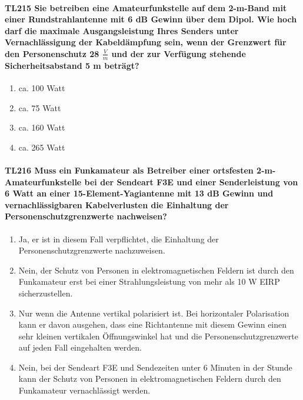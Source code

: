 \documentclass[8pt]{article}
\begin{document}
\paragraph*{TL215 Sie betreiben eine Amateurfunkstelle auf dem 2-m-Band mit einer Rundstrahlantenne mit 6 dB Gewinn über dem Dipol. Wie hoch darf die maximale Ausgangsleistung Ihres Senders unter Vernachlässigung der Kabeldämpfung sein, wenn der Grenzwert für den Personenschutz 28 $\frac{V}{m}$ und der zur Verfügung stehende Sicherheitsabstand 5 m beträgt?}
\begin{enumerate}[nolistsep,label=\Alph*]
\item ca. 100 Watt
\item ca. 75 Watt
\item ca. 160 Watt
\item ca. 265 Watt
\end{enumerate}

\paragraph*{TL216 Muss ein Funkamateur als Betreiber einer ortsfesten 2-m-Amateurfunkstelle bei der Sendeart F3E und einer Senderleistung von 6 Watt an einer 15-Element-Yagiantenne mit 13 dB Gewinn und vernachlässigbaren Kabelverlusten die Einhaltung der Personenschutzgrenzwerte nachweisen?} 
\begin{enumerate}[nolistsep,label=\Alph*]
\item Ja, er ist in diesem Fall verpflichtet, die Einhaltung der Personenschutzgrenzwerte nachzuweisen. 
\item Nein, der Schutz von Personen in elektromagnetischen  Feldern ist durch den Funkamateur erst bei einer Strahlungsleistung von mehr als 10 W EIRP sicherzustellen. 
\item Nur wenn die Antenne vertikal polarisiert ist. Bei horizontaler Polarisation kann er davon ausgehen, dass eine Richtantenne mit diesem Gewinn einen sehr kleinen vertikalen Öffnungswinkel hat und die Personenschutzgrenzwerte auf jeden Fall eingehalten werden.
\item Nein, bei der Sendeart F3E und Sendezeiten unter 6 Minuten in der Stunde kann der Schutz von Personen in elektromagnetischen Feldern durch den Funkamateur vernachlässigt werden.
\end{enumerate}
\end{document}
